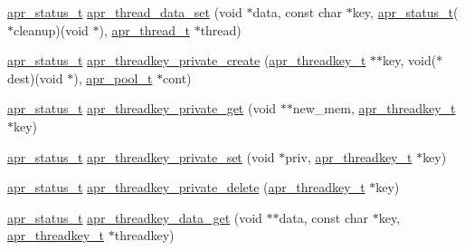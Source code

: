 \begin{DoxyCompactItemize}
\item 
\hyperlink{group__apr__errno_gaf76ee4543247e9fb3f3546203e590a6c}{apr\+\_\+status\+\_\+t} \hyperlink{group__apr__thread__proc_gaa90d79c9935692db4f27a6573f437221}{apr\+\_\+thread\+\_\+data\+\_\+set} (void $\ast$data, const char $\ast$key, \hyperlink{group__apr__errno_gaf76ee4543247e9fb3f3546203e590a6c}{apr\+\_\+status\+\_\+t}($\ast$cleanup)(void $\ast$), \hyperlink{group__apr__thread__proc_ga646c71351e723d84f8cc8c8d1d5937be}{apr\+\_\+thread\+\_\+t} $\ast$thread)
\item 
\hyperlink{group__apr__errno_gaf76ee4543247e9fb3f3546203e590a6c}{apr\+\_\+status\+\_\+t} \hyperlink{group__apr__thread__proc_gacb9553b2b3165388bfc0a54b1148804a}{apr\+\_\+threadkey\+\_\+private\+\_\+create} (\hyperlink{group__apr__thread__proc_ga337c9c1bd2d47740022071a5c41f2edb}{apr\+\_\+threadkey\+\_\+t} $\ast$$\ast$key, void($\ast$dest)(void $\ast$), \hyperlink{group__apr__pools_gaf137f28edcf9a086cd6bc36c20d7cdfb}{apr\+\_\+pool\+\_\+t} $\ast$cont)
\item 
\hyperlink{group__apr__errno_gaf76ee4543247e9fb3f3546203e590a6c}{apr\+\_\+status\+\_\+t} \hyperlink{group__apr__thread__proc_ga371c87c122cc3df0b7ad0031f6e11167}{apr\+\_\+threadkey\+\_\+private\+\_\+get} (void $\ast$$\ast$new\+\_\+mem, \hyperlink{group__apr__thread__proc_ga337c9c1bd2d47740022071a5c41f2edb}{apr\+\_\+threadkey\+\_\+t} $\ast$key)
\item 
\hyperlink{group__apr__errno_gaf76ee4543247e9fb3f3546203e590a6c}{apr\+\_\+status\+\_\+t} \hyperlink{group__apr__thread__proc_ga63501a064ca7f1818aa056b40146aa0b}{apr\+\_\+threadkey\+\_\+private\+\_\+set} (void $\ast$priv, \hyperlink{group__apr__thread__proc_ga337c9c1bd2d47740022071a5c41f2edb}{apr\+\_\+threadkey\+\_\+t} $\ast$key)
\item 
\hyperlink{group__apr__errno_gaf76ee4543247e9fb3f3546203e590a6c}{apr\+\_\+status\+\_\+t} \hyperlink{group__apr__thread__proc_ga20b9b79892a6532784fff023a4ebd8cf}{apr\+\_\+threadkey\+\_\+private\+\_\+delete} (\hyperlink{group__apr__thread__proc_ga337c9c1bd2d47740022071a5c41f2edb}{apr\+\_\+threadkey\+\_\+t} $\ast$key)
\item 
\hyperlink{group__apr__errno_gaf76ee4543247e9fb3f3546203e590a6c}{apr\+\_\+status\+\_\+t} \hyperlink{group__apr__thread__proc_gae203664972dfc5c555620ae1788f5b48}{apr\+\_\+threadkey\+\_\+data\+\_\+get} (void $\ast$$\ast$data, const char $\ast$key, \hyperlink{group__apr__thread__proc_ga337c9c1bd2d47740022071a5c41f2edb}{apr\+\_\+threadkey\+\_\+t} $\ast$threadkey)
\item 
$$
\end{DoxyCompactItemize}
